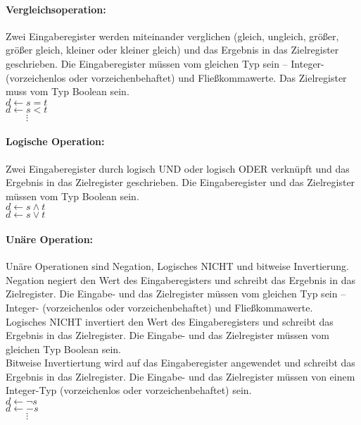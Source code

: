 \documentclass[twoside,a4paper,fleqn,12pt]{article}
\begin{document}
\paragraph{Vergleichsoperation:} Zwei Eingaberegister 
werden miteinander verglichen (gleich, ungleich, größer, größer gleich, kleiner oder kleiner gleich) und das Ergebnis in das Zielregister geschrieben.
Die Eingaberegister müssen vom gleichen Typ sein -- Integer- (vorzeichenlos oder vorzeichenbehaftet) und Fließkommawerte.
Das Zielregister muss vom Typ Boolean sein.
\\\hspace*{1cm}$d \gets s = t$
\\\hspace*{1cm}$d \gets s < t$
\\\hspace*{1cm}$\phantom{d \gets}\vdots$

\paragraph{Logische Operation:} Zwei Eingaberegister durch logisch UND oder logisch ODER verknüpft und das Ergebnis in das Zielregister geschrieben.
Die Eingaberegister und das Zielregister müssen vom Typ Boolean sein.
\\\hspace*{1cm}$d \gets s \land t$
\\\hspace*{1cm}$d \gets s \lor t$

\paragraph{Unäre Operation:} Unäre Operationen sind Negation, Logisches NICHT und bitweise Invertierung.
Negation negiert den Wert des Eingaberegisters und schreibt das Ergebnis in das Zielregister.
Die Eingabe- und das Zielregister müssen vom gleichen Typ sein -- Integer- (vorzeichenlos oder vorzeichenbehaftet) und Fließkommawerte.\\
Logisches NICHT invertiert den Wert des Eingaberegisters und schreibt das Ergebnis in das Zielregister.
Die Eingabe- und das Zielregister müssen vom gleichen Typ Boolean sein.\\
Bitweise Invertiertung wird auf das Eingaberegister angewendet und schreibt das Ergebnis in das Zielregister.
Die Eingabe- und das Zielregister müssen von einem Integer-Typ (vorzeichenlos oder vorzeichenbehaftet) sein.
\\\hspace*{1cm}$d \gets \neg s$
\\\hspace*{1cm}$d \gets -s$
\\\hspace*{1cm}$\phantom{d \gets}\vdots$
\end{document}
